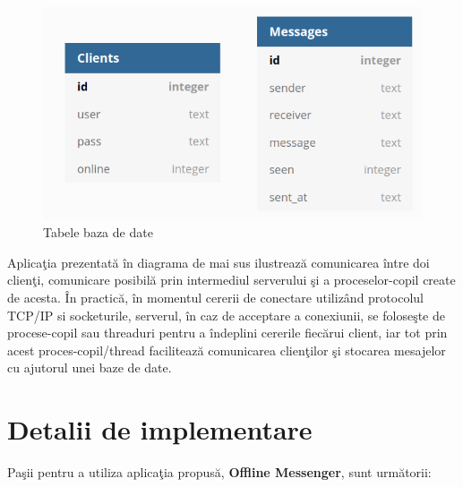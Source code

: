 \documentclass[runningheads]{llncs}
\begin{document}
\begin{figure}
\includegraphics[width=\textwidth]{database.png}
\caption{Tabele baza de date} \label{fig1}
\end{figure}

Aplica\c tia prezentat\u a \^ in diagrama de mai sus ilustreaz\u a comunicarea \^ intre doi clien\c ti, comunicare posibil\u a prin intermediul serverului \c si a proceselor-copil create de acesta. \^ In practic\u a, \^ in momentul cererii de conectare utiliz\^ and protocolul TCP/IP si socketurile, serverul, \^ in caz de acceptare a conexiunii, se folose\c ste de procese-copil sau threaduri  pentru a \^ indeplini cererile fiec\u arui client, iar tot prin acest proces-copil/thread faciliteaz\u a comunicarea clien\c tilor \c si stocarea mesajelor cu ajutorul unei baze de date.

\section{Detalii de implementare}

Pa\c sii pentru a utiliza aplica\c tia propus\u a, {\bf Offline Messenger}, sunt urm\u atorii:
\end{document}
